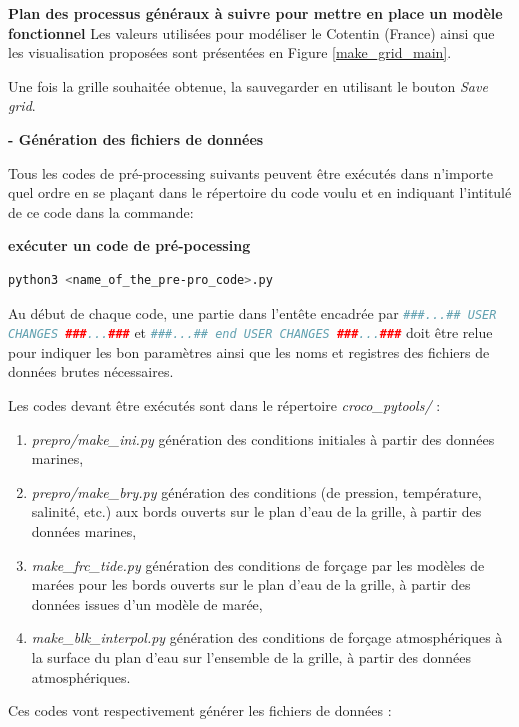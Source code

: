 \documentclass[10pt,a4paper,titlepage]{article}
\begin{document}
\begin{processEnv}{\textbf{Plan des processus généraux à suivre pour mettre en place un modèle fonctionnel}}
    Les valeurs utilisées pour modéliser le Cotentin (France) ainsi que les visualisation proposées sont présentées en Figure \ref{make_grid_main}.

    Une fois la grille souhaitée obtenue, la sauvegarder en utilisant le bouton \textit{Save grid}.

    \textbf{- Génération des fichiers de données}

    Tous les codes de pré-processing suivants peuvent être exécutés dans n'importe quel ordre en se plaçant dans le répertoire du code voulu et en indiquant l'intitulé de ce code dans la commande:

    \begin{codeEnv}{\textbf{exécuter un code de pré-pocessing}}
        \begin{lstlisting}[language=bash]
            python3 <name_of_the_pre-pro_code>.py
        \end{lstlisting}
    \end{codeEnv}

    Au début de chaque code, une partie dans l'entête encadrée par \lstinline[language=python]|###...## USER CHANGES ###...###| et \lstinline[language=python]|###...## end USER CHANGES ###...###| doit être relue pour indiquer les bon paramètres ainsi que les noms et registres des fichiers de données brutes nécessaires.

    Les codes devant être exécutés sont dans le répertoire \textit{croco\_pytools/} :

    \begin{enumerate}
        \item \textit{prepro/make\_ini.py} génération des conditions initiales à partir des données marines,
        \item \textit{prepro/make\_bry.py} génération des conditions (de pression, température, salinité, etc.) aux bords ouverts sur le plan d'eau de la grille, à partir des données marines,
        \item \textit{make\_frc\_tide.py} génération des conditions de forçage par les modèles de marées pour les bords ouverts sur le plan d'eau de la grille, à partir des données issues d'un modèle de marée,
        \item \textit{make\_blk\_interpol.py} génération des conditions de forçage atmosphériques à la surface du plan d'eau sur l'ensemble de la grille, à partir des données atmosphériques.
    \end{enumerate}

    Ces codes vont respectivement générer les fichiers de données :


\end{processEnv}
\end{document}
